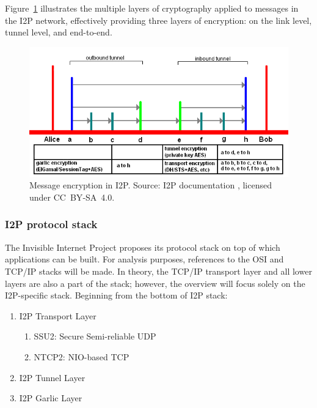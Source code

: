 Figure~\ref{fig:i2p-encryption} illustrates the multiple layers of cryptography applied to messages in the I2P network, effectively providing three layers of encryption: on the link level, tunnel level, and end-to-end.

\begin{figure}[ht]
  \centering
  \includegraphics[width=0.75\linewidth]{Images/i2p-encryption.png}
  \caption{Message encryption in I2P. Source: I2P documentation \cite{i2p-encryption}, licensed under CC BY‑SA 4.0.}
  \label{fig:i2p-encryption}
\end{figure}

\subsubsection{I2P protocol stack}
The Invisible Internet Project proposes its protocol stack on top of which applications can be built. For analysis purposes, references to the OSI and TCP/IP stacks will be made. In theory, the TCP/IP transport layer and all lower layers are also a part of the stack; however, the overview will focus solely on the I2P-specific stack. Beginning from the bottom of I2P stack:
\begin{enumerate}
\item I2P Transport Layer
\begin{enumerate}
\item SSU2: Secure Semi-reliable UDP
\item NTCP2: NIO-based TCP
\end{enumerate}
\item I2P Tunnel Layer
\item I2P Garlic Layer
\end{enumerate}

